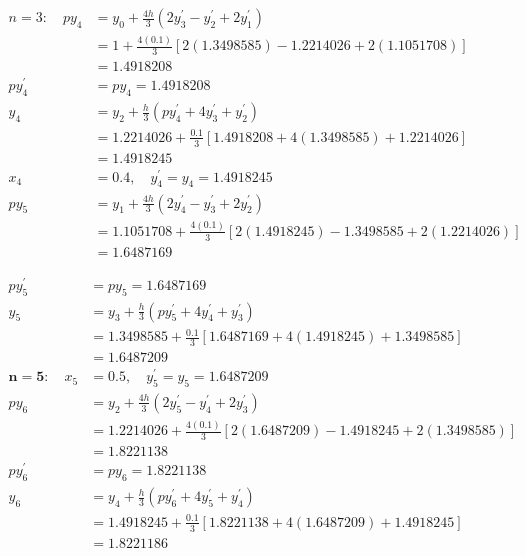 \documentclass[10pt]{article}
\begin{document}
$$
\begin{aligned}
n=3: \quad p y_{4} & =y_{0}+\frac{4 h}{3}\left(2 y_{3}^{\prime}-y_{2}^{\prime}+2 y_{1}^{\prime}\right) \\
& =1+\frac{4(0.1)}{3}[2(1.3498585)-1.2214026+2(1.1051708)] \\
& =1.4918208 \\
p y_{4}^{\prime} & =p y_{4}=1.4918208 \\
y_{4} & =y_{2}+\frac{h}{3}\left(p y_{4}^{\prime}+4 y_{3}^{\prime}+y_{2}^{\prime}\right) \\
& =1.2214026+\frac{0.1}{3}[1.4918208+4(1.3498585)+1.2214026] \\
& =1.4918245 \\
x_{4} & =0.4, \quad y_{4}^{\prime}=y_{4}=1.4918245 \\
p y_{5} & =y_{1}+\frac{4 h}{3}\left(2 y_{4}^{\prime}-y_{3}^{\prime}+2 y_{2}^{\prime}\right) \\
& =1.1051708+\frac{4(0.1)}{3}[2(1.4918245)-1.3498585+2(1.2214026)] \\
& =1.6487169
\end{aligned}
$$

$$
\begin{aligned}
p y_{5}^{\prime} & =p y_{5}=1.6487169 \\
y_{5} & =y_{3}+\frac{h}{3}\left(p y_{5}^{\prime}+4 y_{4}^{\prime}+y_{3}^{\prime}\right) \\
& =1.3498585+\frac{0.1}{3}[1.6487169+4(1.4918245)+1.3498585] \\
& =1.6487209 \\
\boldsymbol{n}=\mathbf{5}: \quad x_{5} & =0.5, \quad y_{5}^{\prime}=y_{5}=1.6487209 \\
p y_{6} & =y_{2}+\frac{4 h}{3}\left(2 y_{5}^{\prime}-y_{4}^{\prime}+2 y_{3}^{\prime}\right) \\
& =1.2214026+\frac{4(0.1)}{3}[2(1.6487209)-1.4918245+2(1.3498585)] \\
& =1.8221138 \\
p y_{6}^{\prime} & =p y_{6}=1.8221138 \\
y_{6} & =y_{4}+\frac{h}{3}\left(p y_{6}^{\prime}+4 y_{5}^{\prime}+y_{4}^{\prime}\right) \\
& =1.4918245+\frac{0.1}{3}[1.8221138+4(1.6487209)+1.4918245] \\
& =1.8221186
\end{aligned}
$$
\end{document}
